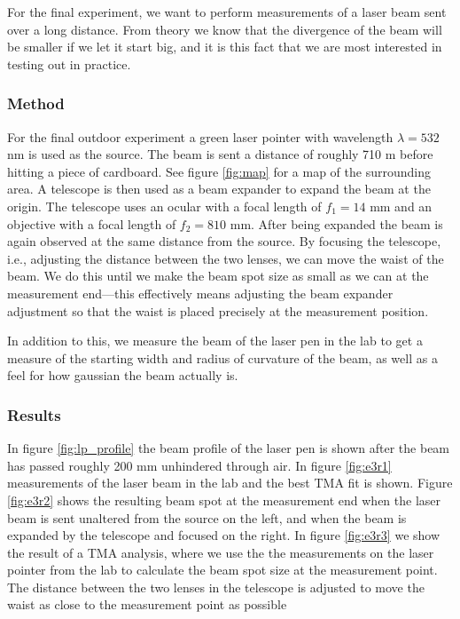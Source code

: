 \documentclass[a4paper, 11pt, notitlepage, english]{article}
\begin{document}
For the final experiment, we want to perform measurements of a laser beam sent over a long distance. From theory we know that the divergence of the beam will be smaller if we let it start big, and it is this fact that we are most interested in testing out in practice.

\subsubsection{Method}

For the final outdoor experiment a green laser pointer with wavelength $\lambda = 532$ nm is used as the source. The beam is sent a distance of roughly 710 m before hitting a piece of cardboard. See figure \ref{fig:map} for a map of the surrounding area. A telescope is then used as a beam expander to expand the beam at the origin.
The telescope uses an ocular with a focal length of $f_1 = 14$ mm and an objective with a focal length of $f_2 = 810$ mm. After being expanded the beam is again observed at the same distance from the source. By focusing the telescope, i.e., adjusting the distance between the two lenses, we can move the waist of the beam. We do this until we make the beam spot size as small as we can at the measurement end---this effectively means adjusting the beam expander adjustment so that the waist is placed precisely at the measurement position.

In addition to this, we measure the beam of the laser pen in the lab to get a measure of the starting width and radius of curvature of the beam, as well as a feel for how gaussian the beam actually is.

\subsubsection{Results}

In figure \ref{fig:lp_profile} the beam profile of the laser pen is shown after the beam has passed roughly 200 mm unhindered through air. In figure \ref{fig:e3r1} measurements of the laser beam in the lab and the best TMA fit is shown. Figure \ref{fig:e3r2} shows the resulting beam spot at the measurement end when the laser beam is sent unaltered from the source on the left, and when the beam is expanded by the telescope and focused on the right. In figure \ref{fig:e3r3} we show the result of a TMA analysis, where we use the the measurements on the laser pointer from the lab to calculate the beam spot size at the measurement point. The distance between the two lenses in the telescope is adjusted to move the waist as close to the measurement point as possible
\end{document}
